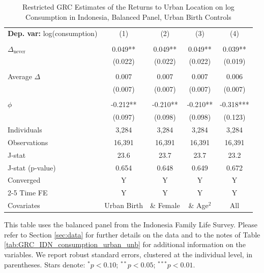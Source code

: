 \begin{table}[htbp] \centering \begin{threeparttable}
 \caption{Restricted GRC Estimates of the Returns to Urban Location on log Consumption in Indonesia, Balanced Panel, Urban Birth Controls} 
 \label{tab:GRC_IDN_consumption_urban_bal_birth} 
\begin{tabular}{l cccc} \toprule  \textbf{Dep. var:}  log(consumption) 
                    &\multicolumn{1}{c}{(1)}   &\multicolumn{1}{c}{(2)}   &\multicolumn{1}{c}{(3)}   &\multicolumn{1}{c}{(4)}   \\
                    &               &               &               &               \\
\addlinespace
$\Delta_{\text{never}}$&       0.049** &       0.049** &       0.049** &       0.039** \\
                    &     (0.022)   &     (0.022)   &     (0.022)   &     (0.019)   \\
                    &               &               &               &               \\
\addlinespace
Average $\Delta$    &       0.007   &       0.007   &       0.007   &       0.006   \\
                    &     (0.007)   &     (0.007)   &     (0.007)   &     (0.007)   \\
                    &               &               &               &               \\
\addlinespace
$\phi$              &      -0.212** &      -0.210** &      -0.210** &      -0.318***\\
                    &     (0.097)   &     (0.098)   &     (0.098)   &     (0.123)   \\
\addlinespace
Individuals         &       3,284   &       3,284   &       3,284   &       3,284   \\
Observations        &      16,391   &      16,391   &      16,391   &      16,391   \\
J-stat              &        23.6   &        23.7   &        23.7   &        23.2   \\
J-stat (p-value)    &       0.654   &       0.648   &       0.649   &       0.672   \\
Converged           &           Y   &           Y   &           Y   &           Y   \\
\cmidrule{2-5} Time FE & Y & Y & Y & Y \\ Covariates & Urban Birth & \& Female & \& Age$^2$ & All \\ \bottomrule \end{tabular} \begin{tablenotes}[flushleft] \footnotesize \item{This table uses the balanced panel from the Indonesia Family Life Survey. Please refer to Section \ref{sec:data} for further details on the data and to the notes of Table \ref{tab:GRC_IDN_consumption_urban_unb} for additional information on the variables. We report robust standard errors, clustered at the individual level, in parentheses. Stars denote: $^{*} p<0.10$; $^{**} p<0.05$; $^{***} p<0.01$.} \end{tablenotes} \end{threeparttable} \end{table}
